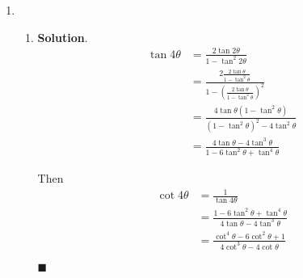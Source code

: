 \documentclass[12pt]{article}
\newenvironment*{sol}{\par \textbf{Solution}.}{\hfill$\blacksquare$}
\begin{document}
\begin{enumerate}
\begin{enumerate}
\begin{enumerate}
\begin{sol}
                    Case 2:
                    \begin{align*}
                        \tan{2\theta}&=-\frac{3}{\sqrt{7}}\\
                        \frac{2\tan{\theta}}{1-\tan^2{\theta}}&=-\frac{3}{\sqrt{7}}\\
                        -2\sqrt{7}\tan{\theta}&=3-3\tan^2{\theta}\\
                        3\tan^2{\theta}-2\sqrt{7}\tan{\theta}-3&=0\\
                        \tan{\theta}&=\frac{2\sqrt{7}\pm\sqrt{28+36}}{6}\\
                        &=\frac{\sqrt{7}\pm 4}{3}
                    \end{align*}
                    By $\tan{\theta}<0$, $\theta=\tan^{-1}(\frac{\sqrt{7}-4}{3})$.

                    Hence the conclusion is $f$ attains minimum at $\theta=\tan^{-1}(\frac{-4\pm\sqrt{7}}{3})$.
                \end{sol}
            \end{enumerate}
        \end{enumerate}
        \item \begin{enumerate}
            \item \begin{sol}
                \begin{align*}
                    \tan{4\theta}&=\frac{2\tan{2\theta}}{1-\tan^2{2\theta}}\\
                    &=\frac{2\frac{2\tan{\theta}}{1-\tan^2{\theta}}}{1-(\frac{2\tan{\theta}}{1-\tan^2{\theta}})^2}\\
                    &=\frac{4\tan{\theta}(1-\tan^2{\theta})}{(1-\tan^2{\theta})^2-4\tan^2{\theta}}\\
                    &=\frac{4\tan{\theta}-4\tan^3{\theta}}{1-6\tan^2{\theta}+\tan^4{\theta}}
                \end{align*}

                Then \begin{align*}
                    \cot{4\theta}&=\frac{1}{\tan{4\theta}}\\
                    &=\frac{1-6\tan^2{\theta}+\tan^4{\theta}}{4\tan{\theta}-4\tan^3{\theta}}\\
                    &=\frac{\cot^4{\theta}-6\cot^2{\theta}+1}{4\cot^3{\theta}-4\cot{\theta}}
                \end{align*}


\end{sol}
\end{enumerate}
\end{enumerate}
\end{document}
